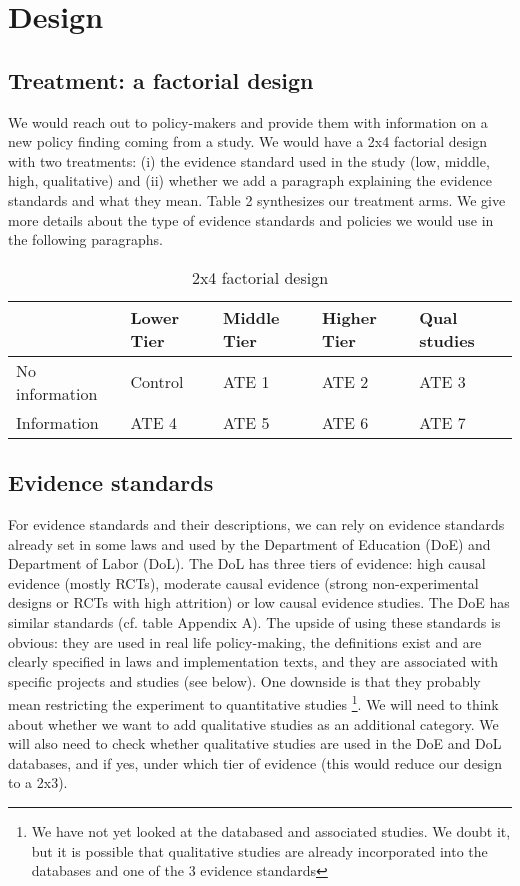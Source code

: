 \documentclass[12pt,final,fleqn]{article}
\theoremstyle{plain}
\begin{document}
\section{Design} \label{sec:Design}

\subsection{Treatment: a factorial design} \label{sec:Treatment}
We would reach out to policy-makers and provide them with information on a new policy finding coming from a study. We would have a 2x4 factorial design with two treatments: (i) the evidence standard used in the study (low, middle, high, qualitative) and (ii) whether we add a paragraph explaining the evidence standards and what they mean. Table 2 synthesizes our treatment arms. We give more details about the type of evidence standards and policies we would use in the following paragraphs. 

\begin{table}[H]
\centering
\caption{2x4 factorial design}
\bigbreak
\begin{tabular}{|l|l|l|l|l|}
\hline
               & Lower Tier & Middle Tier & Higher Tier & Qual studies      \\ \hline
No information & Control    & ATE 1        & ATE 2        & ATE 3             \\ \hline
Information    & ATE 4       & ATE 5        & ATE 6        & ATE 7             \\ \hline
\end{tabular}
\end{table}

\subsection{Evidence standards} \label{sec:Evidence}

For evidence standards and their descriptions, we can rely on evidence standards already set in some laws and used by the Department of Education (DoE) and Department of Labor (DoL). The DoL has three tiers of evidence: high causal evidence (mostly RCTs), moderate causal evidence (strong non-experimental designs or RCTs with high attrition) or low causal evidence studies. The DoE has similar standards (cf. table Appendix A). The upside of using these standards is obvious: they are used in real life policy-making, the definitions exist and are clearly specified in laws and implementation texts, and they are associated with specific projects and studies (see below). One downside is that they probably mean restricting the experiment to quantitative studies \footnote{We have not yet looked at the databased and associated studies. We doubt it, but it is possible that qualitative studies are already incorporated into the databases and one of the 3 evidence standards}. We will need to think about whether we want to add qualitative studies as an additional category. We will also need to check whether qualitative studies are used in the DoE and DoL databases, and if yes, under which tier of evidence (this would reduce our design to a 2x3). 
\end{document}
